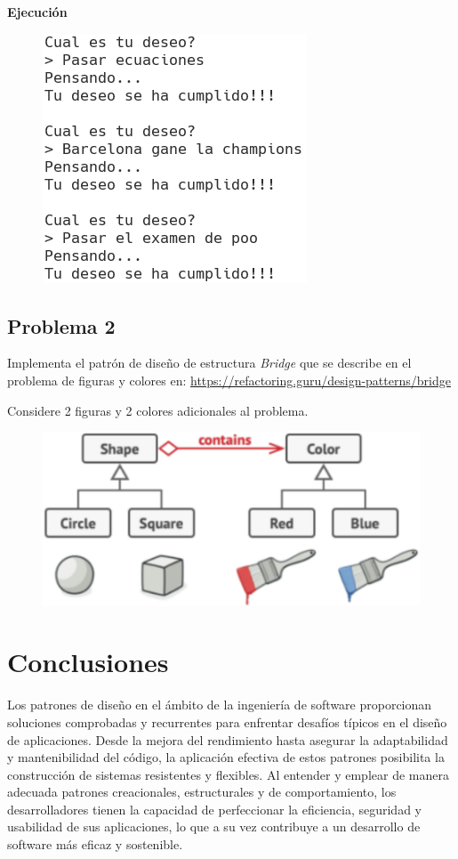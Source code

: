 \documentclass[11pt, twocolumn]{article}
\begin{document}
  \textbf{Ejecución}
  \begin{figure}[h!]
    \centering
    \includegraphics[width=0.6\columnwidth]{13P1.png}
  \end{figure}

  \subsection*{Problema 2}
  Implementa el patrón de diseño de estructura \textit{Bridge} que se describe en el problema de figuras y colores en: \url{https://refactoring.guru/design-patterns/bridge}

  Considere 2 figuras y 2 colores adicionales al problema.

  \begin{figure}[h!]
    \centering
    \includegraphics[width=\columnwidth]{bridge.png}
  \end{figure}

  \section*{Conclusiones}
  Los patrones de diseño en el ámbito de la ingeniería de software proporcionan soluciones comprobadas y recurrentes para enfrentar desafíos típicos en el diseño de aplicaciones. Desde la mejora del rendimiento hasta asegurar la adaptabilidad y mantenibilidad del código, la aplicación efectiva de estos patrones posibilita la construcción de sistemas resistentes y flexibles. Al entender y emplear de manera adecuada patrones creacionales, estructurales y de comportamiento, los desarrolladores tienen la capacidad de perfeccionar la eficiencia, seguridad y usabilidad de sus aplicaciones, lo que a su vez contribuye a un desarrollo de software más eficaz y sostenible.
\end{document}
